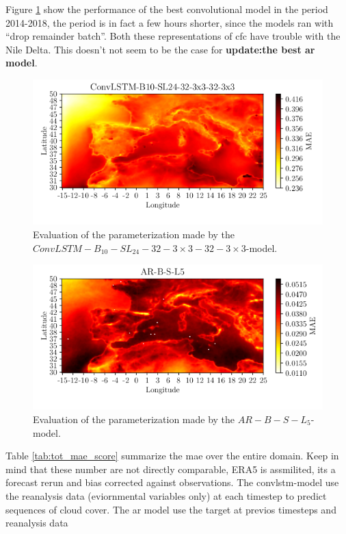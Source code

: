 Figure \ref{fig:MAE_convlstm} show the performance of the best convolutional model in the period 2014-2018, the period is in fact a few hours shorter, since the models ran with ``drop remainder batch''. Both these representations of \acrshort{cfc} have trouble with the Nile Delta. This doesn't not seem to be the case for \textbf{update:the best ar model}.
\begin{figure}
    \centering
    \includegraphics{python_figs/mae_convlstm_vs_target_test_period_2014_to_2018.png}
    \caption{Evaluation of the parameterization made by the $ConvLSTM-B_{10}-SL_{24}-32-3\times3-32-3 \times3$-model.}
    \label{fig:MAE_convlstm}
\end{figure}

\begin{figure}
    \centering
    \includegraphics{python_figs/mea_best_ar_model_tcc_L5_in_folder_AR-B-S-L5.png}
    \caption{Evaluation of the parameterization made by the $AR-B-S-L_5$-model.}
    \label{fig:MAE_AR}
\end{figure}

Table \ref{tab:tot_mae_score} summarize the \acrshort{mae} over the entire domain. Keep in mind that these number are not directly comparable, ERA5 is assmilited, its a forecast rerun and bias corrected against observations. The \acrshort{convlstm}-model use the reanalysis data (eviornmental variables only) at each timestep to predict sequences of cloud cover. The ar model use the target at previos timesteps and reanalysis data 

